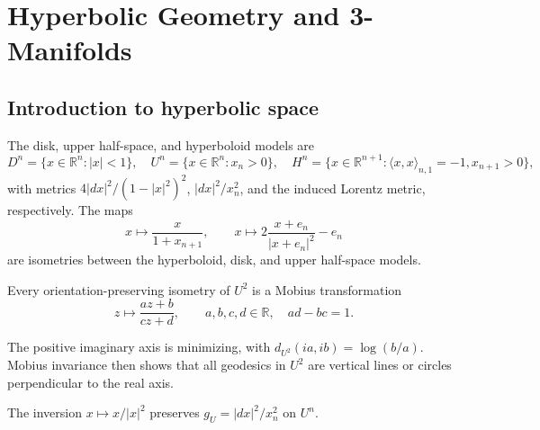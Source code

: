 \chapter[31]{Hyperbolic Geometry and 3-Manifolds}
\label{ch:chow-iv-hyperbolic-geometry-3-manifolds}

\section{Introduction to hyperbolic space}

\begin{definition}
\label{def:chow-iv-hyperbolic-models}
The disk, upper half-space, and hyperboloid models are
\[
 D^n=\{x\in\mathbb R^n:|x|<1\},\quad
 U^n=\{x\in\mathbb R^n:x_n>0\},\quad
 H^n=\{x\in\mathbb R^{n+1}:\langle x,x\rangle_{n,1}=-1, x_{n+1}>0\},
\]
with metrics \(4|dx|^2/(1-|x|^2)^2\), \(|dx|^2/x_n^2\), and the induced
Lorentz metric, respectively.  The maps
\[
 x\mapsto \frac{x}{1+x_{n+1}},\qquad
 x\mapsto 2\frac{x+e_n}{|x+e_n|^2}-e_n
\]
are isometries between the hyperboloid, disk, and upper half-space models.
\end{definition}

\begin{lemma}
\label{lem:chow-iv-hyperbolic-plane-isometries}
Every orientation-preserving isometry of \(U^2\) is a Mobius transformation
\[
 z\longmapsto \frac{az+b}{cz+d},\qquad a,b,c,d\in\mathbb R,\quad ad-bc=1.
\]
\end{lemma}

\begin{example}
\label{ex:chow-iv-hyperbolic-plane-geodesics}
The positive imaginary axis is minimizing, with
\(d_{U^2}(ia,ib)=\log(b/a)\).  Mobius invariance then shows that all
geodesics in \(U^2\) are vertical lines or circles perpendicular to the real
axis.
\end{example}

\begin{lemma}
\label{lem:chow-iv-inversion-hyperbolic-isometry}
The inversion \(x\mapsto x/|x|^2\) preserves \(g_U=|dx|^2/x_n^2\) on \(U^n\).
\end{lemma}

